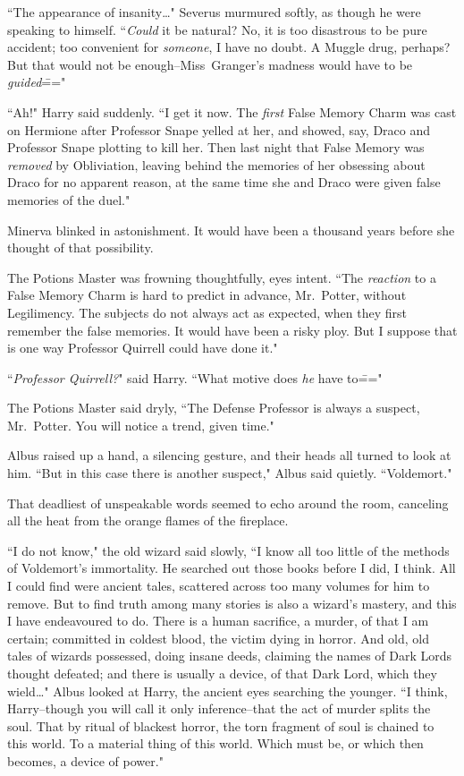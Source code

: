 ``The appearance of insanity{\ldots}" Severus murmured softly, as though he were speaking to himself. ``\emph{Could} it be natural? No, it is too disastrous to be pure accident; too convenient for \emph{someone}, I have no doubt. A Muggle drug, perhaps? But that would not be enough\---Miss~Granger's madness would have to be \emph{guided}\==="

``Ah!" Harry said suddenly. ``I get it now. The \emph{first} False Memory Charm was cast on Hermione after Professor Snape yelled at her, and showed, say, Draco and Professor Snape plotting to kill her. Then last night that False Memory was \emph{removed} by Obliviation, leaving behind the memories of her obsessing about Draco for no apparent reason, at the same time she and Draco were given false memories of the duel."

Minerva blinked in astonishment. It would have been a thousand years before she thought of that possibility.

The Potions Master was frowning thoughtfully, eyes intent. ``The \emph{reaction} to a False Memory Charm is hard to predict in advance, Mr.~Potter, without Legilimency. The subjects do not always act as expected, when they first remember the false memories. It would have been a risky ploy. But I suppose that is one way Professor Quirrell could have done it."

``\emph{Professor Quirrell?}" said Harry. ``What motive does \emph{he} have to\==="

The Potions Master said dryly, ``The Defense Professor is always a suspect, Mr.~Potter. You will notice a trend, given time."

Albus raised up a hand, a silencing gesture, and their heads all turned to look at him. ``But in this case there is another suspect," Albus said quietly. ``Voldemort."

That deadliest of unspeakable words seemed to echo around the room, canceling all the heat from the orange flames of the fireplace.

``I do not know," the old wizard said slowly, ``I know all too little of the methods of Voldemort's immortality. He searched out those books before I did, I think. All I could find were ancient tales, scattered across too many volumes for him to remove. But to find truth among many stories is also a wizard's mastery, and this I have endeavoured to do. There is a human sacrifice, a murder, of that I am certain; committed in coldest blood, the victim dying in horror. And old, old tales of wizards possessed, doing insane deeds, claiming the names of Dark Lords thought defeated; and there is usually a device, of that Dark Lord, which they wield{\ldots}" Albus looked at Harry, the ancient eyes searching the younger. ``I think, Harry\---though you will call it only inference\---that the act of murder splits the soul. That by ritual of blackest horror, the torn fragment of soul is chained to this world. To a material thing of this world. Which must be, or which then becomes, a device of power."

